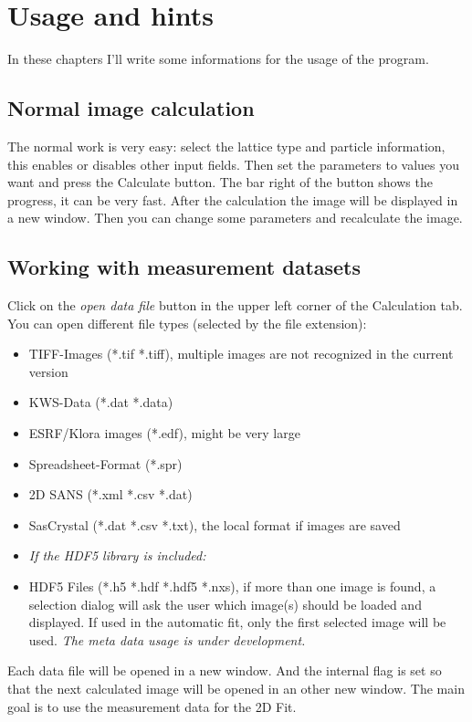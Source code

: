 \documentclass[11pt]{article} %
\begin{document}
\clearpage
\section{Usage and hints}

In these chapters I'll write some informations for the usage of the program.

\subsection{Normal image calculation}

The normal work is very easy: select the lattice type and particle information, this enables or disables other input fields. Then set the parameters to values you want and press the Calculate button. The bar right of the button shows the progress, it can be very fast. After the calculation the image will be displayed in a new window. Then you can change some parameters and recalculate the image.

\subsection{Working with measurement datasets}

Click on the {\it open data file} button in the upper left corner of the Calculation tab. You can open different file types (selected by the file extension):
	\begin{itemize}\itemsep0pt
	\item TIFF-Images (*.tif *.tiff), multiple images are not recognized in the current version
	\item KWS-Data (*.dat *.data)
	\item ESRF/Klora images (*.edf), might be very large
	\item Spreadsheet-Format (*.spr)
	\item 2D SANS (*.xml *.csv *.dat)
	\item SasCrystal (*.dat *.csv *.txt), the local format if images are saved
	\item[] {\it If the HDF5 library is included:}
	\item HDF5 Files (*.h5 *.hdf *.hdf5 *.nxs), if more than one image is found, a selection dialog will ask the user which image(s) should be loaded and displayed. If used in the automatic fit, only the first selected image will be used. {\it The meta data usage is under development.}
	\end{itemize}
Each data file will be opened in a new window. And the internal flag is set so that the next calculated image will be opened in an other new window. The main goal is to use the measurement data for the 2D Fit.
\end{document}
